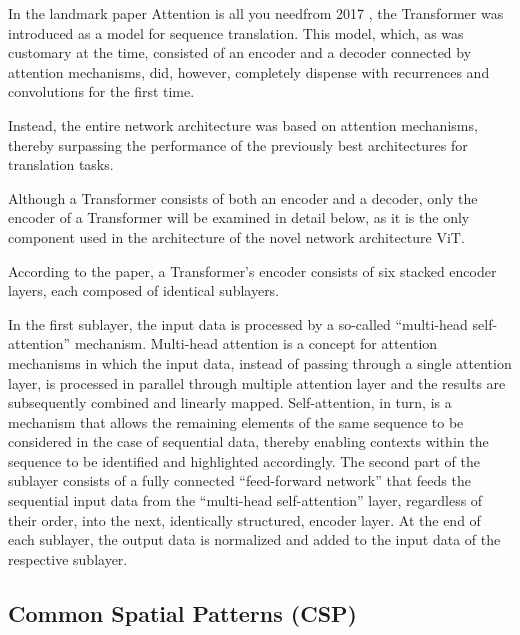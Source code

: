 In the landmark paper \glqq Attention is all you need\grqq \space from 2017 \cite{vaswani-2017}, the Transformer was introduced as a model for sequence translation. This model, which, as was customary at the time, consisted of an encoder and a decoder connected by attention mechanisms, did, however, completely dispense with recurrences and convolutions for the first time.

Instead, the entire network architecture was based on attention mechanisms, thereby surpassing the performance of the previously best architectures for translation tasks.

Although a Transformer consists of both an encoder and a decoder, only the encoder of a Transformer will be examined in detail below, as it is the only component used in the architecture of the novel network architecture \acl{ViT}.

According to the paper, a Transformer's encoder consists of six stacked encoder layers, each composed of identical sublayers.

In the first sublayer, the input data is processed by a so-called ``multi-head self-attention” mechanism. Multi-head attention
is a concept for attention mechanisms in which the input data, instead of passing through a single attention layer, is processed in parallel through multiple attention layer and the results are subsequently combined and linearly mapped. Self-attention, in turn, is a mechanism that allows the remaining elements of the same sequence to be considered in the case of sequential data, thereby enabling contexts within the sequence to be identified and highlighted accordingly. The second part of the sublayer consists of a fully connected ``feed-forward network” that feeds the sequential input data from the ``multi-head self-attention” layer, regardless of their order, into the next, identically structured, encoder layer. At the end of each sublayer, the output data is normalized and added to the input data of the respective sublayer. %




\subsection{Common Spatial Patterns (CSP)}


